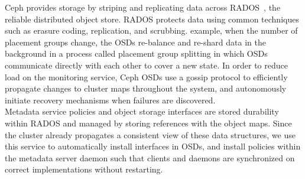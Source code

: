  Ceph provides storage
by striping and replicating data across RADOS~\cite{weil_rados_2007}, the
reliable distributed object store. RADOS protects data using common techniques
such as erasure coding, replication, and scrubbing.  example, when the number
of placement groups change, the OSDs re-balance and re-shard data in the
background in a process called placement group splitting in which OSDs
communicate directly with each other to cover a new state.  In order to reduce
load on the monitoring service, Ceph OSDs use a gossip protocol to efficiently
propagate changes to cluster maps throughout the system, and autonomously
initiate recovery mechanisms when failures are discovered.\\

 Metadata service policies and object
storage interfaces are stored durability within RADOS and managed by storing
references with the object maps. Since the cluster already propagates a
consistent view of these data structures, we use this service to automatically
install interfaces in OSDs, and install policies within the metadata server
daemon  such that clients and daemons are synchronized on
correct implementations without restarting.

 
